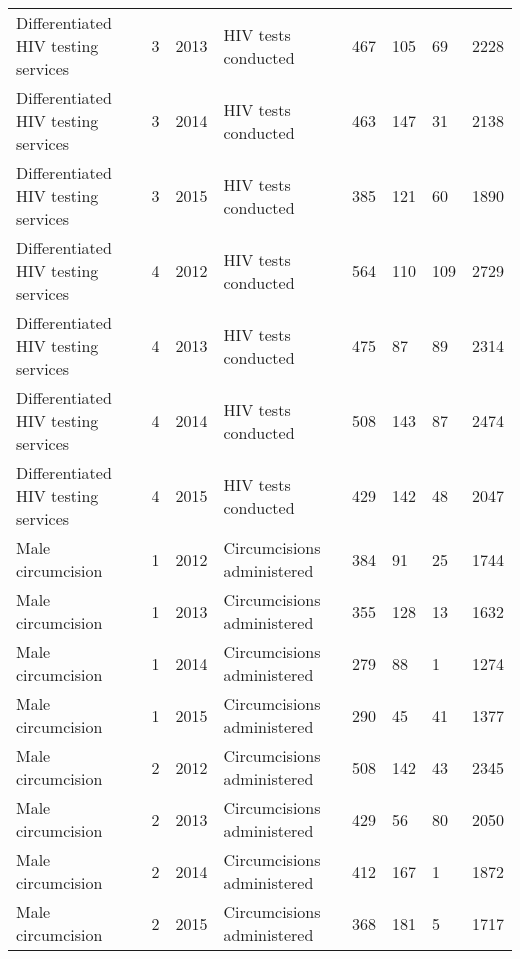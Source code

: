 \documentclass{article}
\begin{document}
\begin{table}[]
\begin{tabular}{llllllll}
Differentiated HIV testing services & 3    & 2013 & HIV tests conducted        & 467       & 105                & 69              & 2228   \\
Differentiated HIV testing services & 3    & 2014 & HIV tests conducted        & 463       & 147                & 31              & 2138   \\
Differentiated HIV testing services & 3    & 2015 & HIV tests conducted        & 385       & 121                & 60              & 1890   \\
Differentiated HIV testing services & 4    & 2012 & HIV tests conducted        & 564       & 110                & 109             & 2729   \\
Differentiated HIV testing services & 4    & 2013 & HIV tests conducted        & 475       & 87                 & 89              & 2314   \\
Differentiated HIV testing services & 4    & 2014 & HIV tests conducted        & 508       & 143                & 87              & 2474   \\
Differentiated HIV testing services & 4    & 2015 & HIV tests conducted        & 429       & 142                & 48              & 2047   \\
Male circumcision                   & 1    & 2012 & Circumcisions administered & 384       & 91                 & 25              & 1744   \\
Male circumcision                   & 1    & 2013 & Circumcisions administered & 355       & 128                & 13              & 1632   \\
Male circumcision                   & 1    & 2014 & Circumcisions administered & 279       & 88                 & 1               & 1274   \\
Male circumcision                   & 1    & 2015 & Circumcisions administered & 290       & 45                 & 41              & 1377   \\
Male circumcision                   & 2    & 2012 & Circumcisions administered & 508       & 142                & 43              & 2345   \\
Male circumcision                   & 2    & 2013 & Circumcisions administered & 429       & 56                 & 80              & 2050   \\
Male circumcision                   & 2    & 2014 & Circumcisions administered & 412       & 167                & 1               & 1872   \\
Male circumcision                   & 2    & 2015 & Circumcisions administered & 368       & 181                & 5               & 1717   \\

\end{tabular}
\end{table}
\end{document}
